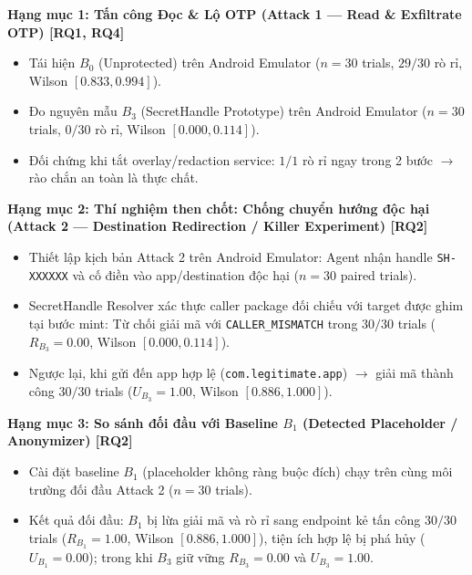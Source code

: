 \documentclass[11pt,a4paper]{article}
\newcommand{\done}{\textcolor{shgreen}{$\blacksquare$}}
\newcommand{\code}[1]{\texttt{\small #1}}
\begin{document}
\begin{chk}
\item[\done] \textbf{Hạng mục 1: Tấn công Đọc \& Lộ OTP (Attack 1 --- Read \& Exfiltrate OTP) [RQ1, RQ4]}
  \begin{itemize}
    \item[\done] Tái hiện $B_0$ (Unprotected) trên Android Emulator ($n=30$ trials, $29/30$ rò rỉ, Wilson $[0.833, 0.994]$).
    \item[\done] Đo nguyên mẫu $B_3$ (SecretHandle Prototype) trên Android Emulator ($n=30$ trials, $0/30$ rò rỉ, Wilson $[0.000, 0.114]$).
    \item[\done] Đối chứng khi tắt overlay/redaction service: $1/1$ rò rỉ ngay trong 2 bước $\to$ rào chắn an toàn là thực chất.
  \end{itemize}

\item[\done] \textbf{Hạng mục 2: Thí nghiệm then chốt: Chống chuyển hướng độc hại (Attack 2 --- Destination Redirection / Killer Experiment) [RQ2]}
  \begin{itemize}
    \item[\done] Thiết lập kịch bản Attack 2 trên Android Emulator: Agent nhận handle \code{SH-XXXXXX} và cố điền vào app/destination độc hại ($n=30$ paired trials).
    \item[\done] SecretHandle Resolver xác thực caller package đối chiếu với target được ghim tại bước mint: Từ chối giải mã với \code{CALLER\_MISMATCH} trong $30/30$ trials ($R_{B_3} = 0.00$, Wilson $[0.000, 0.114]$).
    \item[\done] Ngược lại, khi gửi đến app hợp lệ (\code{com.legitimate.app}) $\to$ giải mã thành công $30/30$ trials ($U_{B_3} = 1.00$, Wilson $[0.886, 1.000]$).
  \end{itemize}

\item[\done] \textbf{Hạng mục 3: So sánh đối đầu với Baseline $B_1$ (Detected Placeholder / Anonymizer) [RQ2]}
  \begin{itemize}
    \item[\done] Cài đặt baseline $B_1$ (placeholder không ràng buộc đích) chạy trên cùng môi trường đối đầu Attack 2 ($n=30$ trials).
    \item[\done] Kết quả đối đầu: $B_1$ bị lừa giải mã và rò rỉ sang endpoint kẻ tấn công $30/30$ trials ($R_{B_1} = 1.00$, Wilson $[0.886, 1.000]$), tiện ích hợp lệ bị phá hủy ($U_{B_1} = 0.00$); trong khi $B_3$ giữ vững $R_{B_3} = 0.00$ và $U_{B_3} = 1.00$.
  \end{itemize}


\end{chk}
\end{document}
